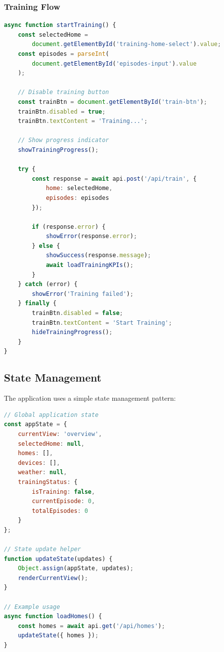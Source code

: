 \documentclass[12pt,a4paper]{article}
\begin{document}
\subsubsection{Training Flow}

\begin{lstlisting}[language=JavaScript, caption=Starting RL training]
async function startTraining() {
    const selectedHome = 
        document.getElementById('training-home-select').value;
    const episodes = parseInt(
        document.getElementById('episodes-input').value
    );
    
    // Disable training button
    const trainBtn = document.getElementById('train-btn');
    trainBtn.disabled = true;
    trainBtn.textContent = 'Training...';
    
    // Show progress indicator
    showTrainingProgress();
    
    try {
        const response = await api.post('/api/train', {
            home: selectedHome,
            episodes: episodes
        });
        
        if (response.error) {
            showError(response.error);
        } else {
            showSuccess(response.message);
            await loadTrainingKPIs();
        }
    } catch (error) {
        showError('Training failed');
    } finally {
        trainBtn.disabled = false;
        trainBtn.textContent = 'Start Training';
        hideTrainingProgress();
    }
}
\end{lstlisting}

\subsection{State Management}

The application uses a simple state management pattern:

\begin{lstlisting}[language=JavaScript, caption=Application state management]
// Global application state
const appState = {
    currentView: 'overview',
    selectedHome: null,
    homes: [],
    devices: [],
    weather: null,
    trainingStatus: {
        isTraining: false,
        currentEpisode: 0,
        totalEpisodes: 0
    }
};

// State update helper
function updateState(updates) {
    Object.assign(appState, updates);
    renderCurrentView();
}

// Example usage
async function loadHomes() {
    const homes = await api.get('/api/homes');
    updateState({ homes });
}
\end{lstlisting}
\end{document}
